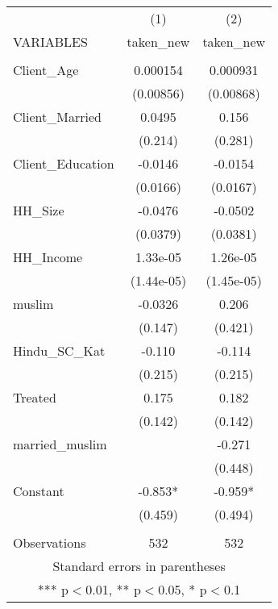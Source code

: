 \begin{tabular}{lcc} \hline
 & (1) & (2) \\
VARIABLES & taken\_new & taken\_new \\ \hline
 &  &  \\
Client\_Age & 0.000154 & 0.000931 \\
 & (0.00856) & (0.00868) \\
Client\_Married & 0.0495 & 0.156 \\
 & (0.214) & (0.281) \\
Client\_Education & -0.0146 & -0.0154 \\
 & (0.0166) & (0.0167) \\
HH\_Size & -0.0476 & -0.0502 \\
 & (0.0379) & (0.0381) \\
HH\_Income & 1.33e-05 & 1.26e-05 \\
 & (1.44e-05) & (1.45e-05) \\
muslim & -0.0326 & 0.206 \\
 & (0.147) & (0.421) \\
Hindu\_SC\_Kat & -0.110 & -0.114 \\
 & (0.215) & (0.215) \\
Treated & 0.175 & 0.182 \\
 & (0.142) & (0.142) \\
married\_muslim &  & -0.271 \\
 &  & (0.448) \\
Constant & -0.853* & -0.959* \\
 & (0.459) & (0.494) \\
 &  &  \\
 Observations & 532 & 532 \\ \hline
\multicolumn{3}{c}{ Standard errors in parentheses} \\
\multicolumn{3}{c}{ *** p$<$0.01, ** p$<$0.05, * p$<$0.1} \\
\end{tabular}
